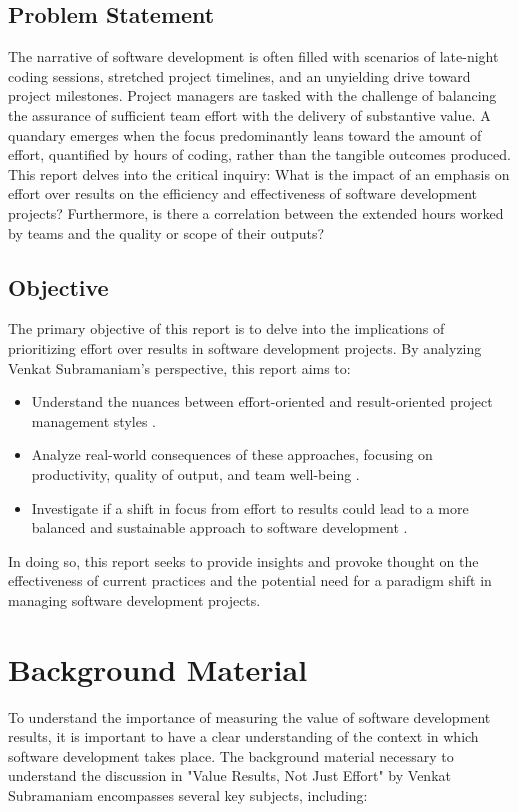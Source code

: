 \documentclass{article}
\begin{document}
\subsection{Problem Statement}
The narrative of software development is often filled with scenarios of late-night coding sessions, stretched project timelines, and an unyielding drive toward project milestones. Project managers are tasked with the challenge of balancing the assurance of sufficient team effort with the delivery of substantive value. A quandary emerges when the focus predominantly leans toward the amount of effort, quantified by hours of coding, rather than the tangible outcomes produced. This report delves into the critical inquiry: What is the impact of an emphasis on effort over results on the efficiency and effectiveness of software development projects? Furthermore, is there a correlation between the extended hours worked by teams and the quality or scope of their outputs? \cite{FayadSchmidt1997, Lowe2019SoftwareMetrics}

\subsection{Objective}
The primary objective of this report is to delve into the implications of prioritizing effort over results in software development projects. By analyzing Venkat Subramaniam's perspective, this report aims to:
\begin{itemize}
    \item Understand the nuances between effort-oriented and result-oriented project management styles \cite{Verbeeten2015}.
    \item Analyze real-world consequences of these approaches, focusing on productivity, quality of output, and team well-being \cite{BudacuPocatilu2018, DalMas2019OutputOutcome}.
    \item Investigate if a shift in focus from effort to results could lead to a more balanced and sustainable approach to software development \cite{WagnerDeissenboeck2019}.
\end{itemize}
In doing so, this report seeks to provide insights and provoke thought on the effectiveness of current practices and the potential need for a paradigm shift in managing software development projects.



\newpage
\section{Background Material}
To understand the importance of measuring the value of software development results, it is important to have a clear understanding of the context in which software development takes place. The background material necessary to understand the discussion in "Value Results, Not Just Effort" by Venkat Subramaniam encompasses several key subjects, including:
\end{document}
